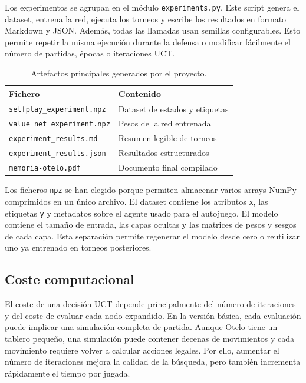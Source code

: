 \documentclass[conference,a4paper]{IEEEtran}
\begin{document}
Los experimentos se agrupan en el módulo \texttt{experiments.py}. Este script
genera el dataset, entrena la red, ejecuta los torneos y escribe los resultados
en formato Markdown y JSON. Además, todas las llamadas usan semillas
configurables. Esto permite repetir la misma ejecución durante la defensa o
modificar fácilmente el número de partidas, épocas o iteraciones UCT.

\begin{table}[h]
\centering
\caption{Artefactos principales generados por el proyecto.}
\label{tab:artefactos}
\begin{tabular}{ll}
\toprule
Fichero & Contenido \\
\midrule
\texttt{selfplay\_experiment.npz} & Dataset de estados y etiquetas \\
\texttt{value\_net\_experiment.npz} & Pesos de la red entrenada \\
\texttt{experiment\_results.md} & Resumen legible de torneos \\
\texttt{experiment\_results.json} & Resultados estructurados \\
\texttt{memoria-otelo.pdf} & Documento final compilado \\
\bottomrule
\end{tabular}
\end{table}

Los ficheros \texttt{npz} se han elegido porque permiten almacenar varios
arrays NumPy comprimidos en un único archivo. El dataset contiene los atributos
\texttt{x}, las etiquetas \texttt{y} y metadatos sobre el agente usado para el
autojuego. El modelo contiene el tamaño de entrada, las capas ocultas y las
matrices de pesos y sesgos de cada capa. Esta separación permite regenerar el
modelo desde cero o reutilizar uno ya entrenado en torneos posteriores.

\subsection{Coste computacional}

El coste de una decisión UCT depende principalmente del número de iteraciones y
del coste de evaluar cada nodo expandido. En la versión básica, cada evaluación
puede implicar una simulación completa de partida. Aunque Otelo tiene un tablero
pequeño, una simulación puede contener decenas de movimientos y cada movimiento
requiere volver a calcular acciones legales. Por ello, aumentar el número de
iteraciones mejora la calidad de la búsqueda, pero también incrementa
rápidamente el tiempo por jugada.
\end{document}
